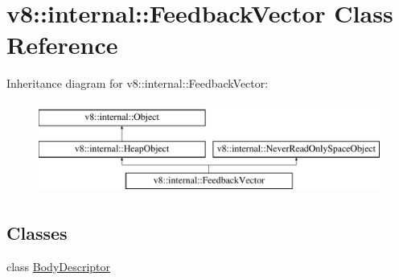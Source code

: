 \hypertarget{classv8_1_1internal_1_1FeedbackVector}{}\section{v8\+:\+:internal\+:\+:Feedback\+Vector Class Reference}
\label{classv8_1_1internal_1_1FeedbackVector}
Inheritance diagram for v8\+:\+:internal\+:\+:Feedback\+Vector\+:\begin{figure}[H]
\begin{center}
\leavevmode
\includegraphics[height=3.000000cm]{classv8_1_1internal_1_1FeedbackVector}
\end{center}
\end{figure}
\subsection*{Classes}
\begin{DoxyCompactItemize}
\item 
class \mbox{\hyperlink{classv8_1_1internal_1_1FeedbackVector_1_1BodyDescriptor}{Body\+Descriptor}}
\end{DoxyCompactItemize}
